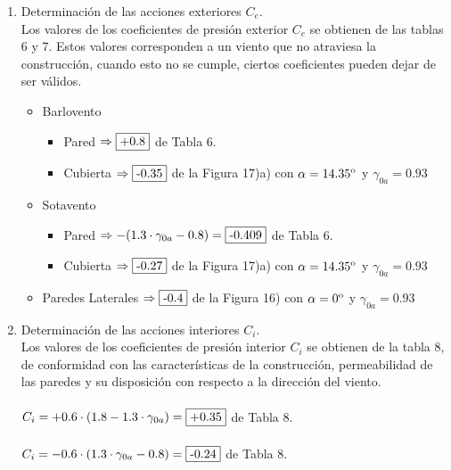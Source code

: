 \begin{enumerate}
\item Determinación de las acciones exteriores $C_e$.\\
Los valores de los coeficientes de presión exterior $C_e$ se obtienen de las tablas 6 y 7. Estos valores corresponden a un viento que no atraviesa la construcción, cuando esto no se cumple, ciertos coeficientes pueden dejar de ser válidos.\\
\begin{itemize}
	\item Barlovento	
		\begin{itemize}
		\item Pared $\Rightarrow \framebox{+0.8} $ de Tabla 6.
        \item Cubierta $\Rightarrow \framebox{-0.35} $ de la Figura 17)a) con $\alpha = 14.35\textsuperscript{o}$ y $\gamma_{0a}=0.93$
		\end{itemize}
	\item Sotavento
		\begin{itemize}
		\item Pared $\Rightarrow -(1.3 \cdot \gamma_{0a}-0.8) = \framebox{-0.409}$ de Tabla 6.
        \item Cubierta $\Rightarrow \framebox{-0.27} $ de la Figura 17)a) con $\alpha = 14.35\textsuperscript{o}$ y $\gamma_{0a}=0.93$
		\end{itemize}
	\item Paredes Laterales $\Rightarrow \framebox{-0.4} $ de la Figura 16) con $\alpha = 0\textsuperscript{o} $ y $\gamma_{0a}=0.93$
\end{itemize}

\item Determinación de las acciones interiores $C_i$.\\
Los valores de los coeficientes de presión interior $C_i$ se obtienen de la tabla 8, de conformidad con las características de la construcción, permeabilidad de las paredes y su disposición con respecto a la dirección del viento.\\
\\
$ C_i = + 0.6 \cdot (1.8 -1.3 \cdot \gamma_{0a}) = \framebox{+0.35} $ de Tabla 8.\\
\\
$ C_i = - 0.6 \cdot (1.3 \cdot \gamma_{0a} - 0.8) = \framebox{-0.24} $ de Tabla 8.\\


\end{enumerate}
